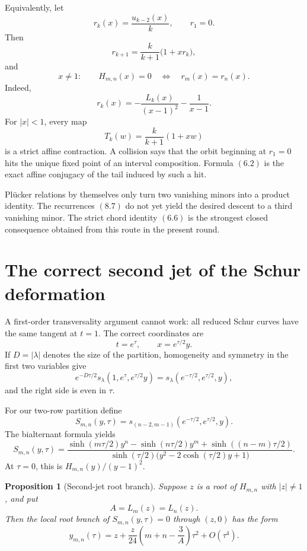 \documentclass[11pt]{article}
\newtheorem{proposition}[theorem]{Proposition}
\theoremstyle{definition}
\begin{document}
Equivalently, let
\[
 r_k(x)=\frac{u_{k-2}(x)}k,
 \qquad r_1=0.
\]
Then
\begin{equation}
 r_{k+1}=\frac{k}{k+1}\bigl(1+xr_k\bigr),
 \tag{8.9}
\end{equation}
and
\begin{equation}
 x\neq1:\qquad
 H_{m,n}(x)=0
 \quad\Longleftrightarrow\quad
 r_m(x)=r_n(x).
 \tag{8.10}
\end{equation}
Indeed,
\begin{equation}
 r_k(x)=-\frac{L_k(x)}{(x-1)^2}-\frac1{x-1}.
 \tag{8.11}
\end{equation}
For \(|x|<1\), every map
\[
 T_k(w)=\frac{k}{k+1}(1+xw)
\]
is a strict affine contraction.  A collision says that the orbit beginning at
\(r_1=0\) hits the unique fixed point of an interval composition.  Formula
\((6.2)\) is the exact affine conjugacy of the tail induced by such a hit.

Pl\"ucker relations by themselves only turn two vanishing minors into a product
identity.  The recurrences \((8.7)\) do not yet yield the desired descent to a
third vanishing minor.  The strict chord identity \((6.6)\) is the strongest
closed consequence obtained from this route in the present round.

\section{The correct second jet of the Schur deformation}
\label{sec:secondjet}

A first-order transversality argument cannot work: all reduced Schur curves
have the same tangent at \(t=1\).  The correct coordinates are
\[
 t=e^\tau,
 \qquad
 x=e^{\tau/2}y.
\]
If $D=|\lambda|$ denotes the size of the partition, homogeneity and symmetry
in the first two variables give
\[
 e^{-D\tau/2}s_\lambda(1,e^\tau,e^{\tau/2}y)
 =s_\lambda(e^{-\tau/2},e^{\tau/2},y),
\]
and the right side is even in \(\tau\).

For our two-row partition define
\[
 S_{m,n}(y,\tau)
 =s_{(n-2,m-1)}(e^{-\tau/2},e^{\tau/2},y).
\]
The bialternant formula yields
\begin{equation}
 S_{m,n}(y,\tau)=
 \frac{
 \sinh(m\tau/2)y^n-
 \sinh(n\tau/2)y^m+
 \sinh((n-m)\tau/2)
 }{
 \sinh(\tau/2)
 \bigl(y^2-2\cosh(\tau/2)y+1\bigr)
 }.
 \tag{9.1}
\end{equation}
At \(\tau=0\), this is \(H_{m,n}(y)/(y-1)^2\).

\begin{proposition}[Second-jet root branch]\label{prop:secondjet}
Suppose $z$ is a root of $H_{m,n}$ with $|z|\neq1$, and put
\[
 A=L_m(z)=L_n(z).
\]
Then the local root branch of \(S_{m,n}(y,\tau)=0\) through \((z,0)\) has the
form
\begin{equation}
 y_{m,n}(\tau)=z+
 \frac z{24}\left(m+n-\frac3A\right)\tau^2+O(\tau^4).
 \tag{9.2}
\end{equation}
\end{proposition}
\end{document}

